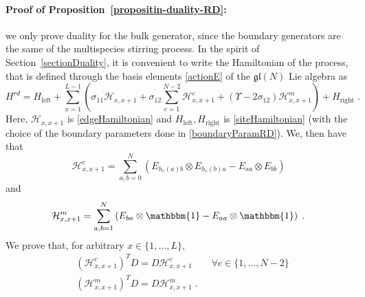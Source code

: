 \documentclass[10pt]{article}
\numberwithin{equation}{section}
\numberwithin{equation}{subsection}
\newcommand{\dt}{\;.}
\begin{document}

\paragraph{Proof of Proposition~\ref{propositin-duality-RD}:}
we only prove duality for the bulk generator, since the boundary generators are the same of the multispecies stirring process. In the spirit of Section~\ref{sectionDuality}, it is convenient to write the Hamiltonian of the process, that is defined through the basis elements \eqref{actionE} of the $\mathfrak{gl}(N)$ Lie algebra as 
\begin{equation}
	H^{rd}=H_{\text{left}}+\sum_{x=1}^{L-1}\left(\sigma_{11}\mathcal{H}_{x,x+1}+\sigma_{12}\sum_{c=1}^{N-2}\mathcal{H}_{x,x+1}^{c}+(\Upsilon-2\sigma_{12})\mathcal{H}_{x,x+1}^{m}\right)+H_{\text{right}}\dt
\end{equation}
Here, $\mathcal{H}_{x,x+1}$ is  \eqref{edgeHamiltonian}  and $H_{\text{left}},H_{\text{right}}$ is \eqref{siteHamiltonian} (with the choice of the boundary parameters done in \eqref{boundaryParamRD}). We, then have that 
\begin{equation}
	\mathcal{H}_{x,x+1}^{c}=\sum_{a,b=0}^{N}\left(E_{h_{c}(a)b}\otimes E_{h_{c}(b)a}-E_{aa}\otimes E_{bb}\right)
\end{equation}
and 
\begin{equation}
	\mathcal{H}_{x,x+1}^{m}=\sum_{a,b=1}^{N}\left(E_{ba}\otimes \mathbbm{1}-E_{aa}\otimes \mathbbm{1}\right)\dt
\end{equation}
We prove that, for arbitrary $x\in\{1,\ldots,L\}$,
\begin{align}
	&(\mathcal{H}_{x,x+1}^{c})^{T}D=D\mathcal{H}_{x,x+1}^{c}\qquad \forall c\in \{1,\ldots,N-2\}\label{cDualityRelation}\\
	&(\mathcal{H}_{x,x+1}^{m})^{T}D=D\mathcal{H}_{x,x+1}^{m}\label{mDualityRelation}\dt
\end{align}
\end{document}
